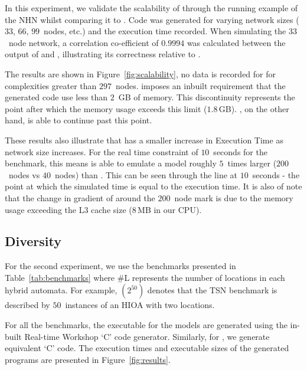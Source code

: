 In this experiment, we  validate the scalability of
\ourTool through the running example of the \ac{NHN} whilst comparing it
to \simulink.  Code was generated for varying network sizes ($33$,
$66$, $99$~nodes, etc.) and the execution time recorded.  When simulating the 
$33$~node network, a correlation co-efficient of $0.9994$ was 
calculated between the output of \ourTool and \simulink, illustrating its 
correctness relative to \simulink.

The results are shown in Figure~\ref{fig:scalability}, 
no data is recorded for \simulink for
complexities greater than $297$~nodes.  \simulink imposes an inbuilt
requirement that the generated code use less than $2$~GB of memory. This
discontinuity represents the point after which the memory usage exceeds
this limit ($1.8$\,GB).
\ourTool, on the other hand, is able to continue past this
point.

These results also illustrate that \ourTool has a smaller increase in
Execution Time as network size increases. For the real time constraint of 
$10$~seconds for the benchmark, this means \ourTool is able to emulate a model 
roughly $5$~times larger ($200$~nodes vs $40$~nodes) than \simulink.  This 
can be seen through the line at $10$~seconds - the point at which the simulated 
time is equal to the execution time.  It is also of note that the change in 
gradient of \ourTool around the $200$~node mark is due to the memory usage 
exceeding the L$3$ cache size ($8$\,MB in our CPU).


\subsection{Diversity}
\label{sec:diversity}



For the second experiment, we use the  benchmarks
presented in Table~\ref{tab:benchmarks} where  
\#L represents the number of locations in each hybrid automata.  For example,
$(2^{50})$ denotes that the \acf{TSN} benchmark is described by $50$~instances 
of an \ac{HIOA} with two locations.

For all the benchmarks, the executable for the \simulink models are
generated using the in-built Real-time
Workshop\textsuperscript{\textregistered} `C' code generator.  Similarly,
for \ourTool, we generate equivalent `C' code.
The execution times and executable sizes of the generated programs are  
presented  in Figure~\ref{fig:results}.

